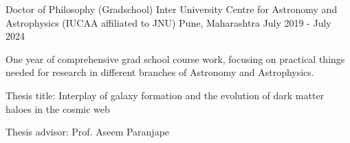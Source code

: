 


\begin{cventries}
{
\cventry
{Doctor of Philosophy (Gradschool)}
{Inter University Centre for Astronomy and Astrophysics (IUCAA affiliated to JNU)}
{Pune, Maharashtra}
{July 2019 - July 2024 }
{
\begin{cvitems}
\item One year of comprehensive grad school course work, focusing on practical things needed for research in different branches of Astronomy and Astrophysics.
\item Thesis title: Interplay of galaxy formation and the evolution of dark matter haloes in the cosmic web
\item Thesis advisor: Prof. Aseem Paranjape
\end{cvitems}
}
}


\end{cventries}

